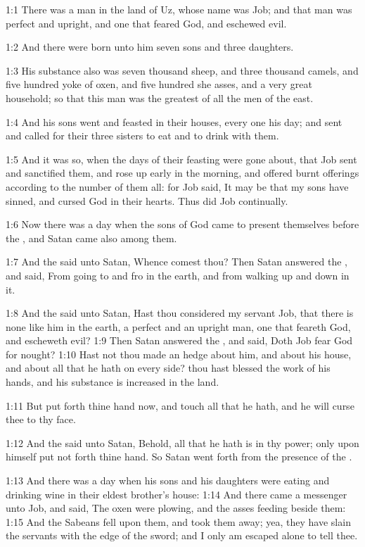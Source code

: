 

1:1 There was a man in the land of Uz, whose name was Job; and that
man was perfect and upright, and one that feared God, and eschewed evil.

1:2 And there were born unto him seven sons and three daughters.

1:3 His substance also was seven thousand sheep, and three thousand
camels, and five hundred yoke of oxen, and five hundred she asses, and
a very great household; so that this man was the greatest of all the
men of the east.

1:4 And his sons went and feasted in their houses, every one his day;
and sent and called for their three sisters to eat and to drink with
them.

1:5 And it was so, when the days of their feasting were gone about,
that Job sent and sanctified them, and rose up early in the morning,
and offered burnt offerings according to the number of them all: for
Job said, It may be that my sons have sinned, and cursed God in their
hearts. Thus did Job continually.

1:6 Now there was a day when the sons of God came to present
themselves before the \LORD, and Satan came also among them.

1:7 And the \LORD said unto Satan, Whence comest thou? Then Satan
answered the \LORD, and said, From going to and fro in the earth, and
from walking up and down in it.

1:8 And the \LORD said unto Satan, Hast thou considered my servant Job,
that there is none like him in the earth, a perfect and an upright
man, one that feareth God, and escheweth evil?  1:9 Then Satan
answered the \LORD, and said, Doth Job fear God for nought?  1:10 Hast
not thou made an hedge about him, and about his house, and about all
that he hath on every side? thou hast blessed the work of his hands,
and his substance is increased in the land.

1:11 But put forth thine hand now, and touch all that he hath, and he
will curse thee to thy face.

1:12 And the \LORD said unto Satan, Behold, all that he hath is in thy
power; only upon himself put not forth thine hand. So Satan went forth
from the presence of the \LORD.

1:13 And there was a day when his sons and his daughters were eating
and drinking wine in their eldest brother's house: 1:14 And there came
a messenger unto Job, and said, The oxen were plowing, and the asses
feeding beside them: 1:15 And the Sabeans fell upon them, and took
them away; yea, they have slain the servants with the edge of the
sword; and I only am escaped alone to tell thee.

